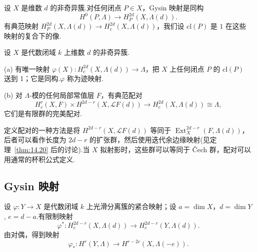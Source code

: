 设 $X$ 是维数 $d$ 的非奇异簇.对任何闭点 $P \in X$，Gysin 映射是同构
\[
H^{0}(P, \Lambda) \to H^{2d}_{P}(X, \Lambda(d)).
\]
有典范映射 $H^{2d}_{P}(X, \Lambda(d)) \to H^{2d}_{c}(X, \Lambda(d))$，我们设 $\mathrm{cl}(P)$ 是 $1$ 在这些映射的复合下的像.

\begin{theorem}\label{thm:24.1}
设 $X$ 是代数闭域 $k$ 上维数 $d$ 的非奇异簇.

(a) 有唯一映射 $\varphi(X) \colon H^{2d}_{c}(X, \Lambda(d)) \to \Lambda$，把 $X$ 上任何闭点 $P$ 的 $\mathrm{cl}(P)$ 送到 1；它是同构.$\varphi$ 称为迹映射.

(b) 对 $\Lambda$-模的任何局部常值层 $F$，有典范配对
\[
H^{r}_{c}(X, F) \times H^{2d-r}(X, \mathcal{L}F(d)) \to H^{2d}_{c}(X, \Lambda(d)) \cong \Lambda,
\]
它们是有限群的完美配对.
\end{theorem}

定义配对的一种方法是将 $H^{2d-r}(X, \mathcal{L}F(d))$ 等同于 $\operatorname{Ext}^{2d-r}_{X}(F, \Lambda(d))$，后者可以看作长度为 $2d - r$ 的扩张群，然后使用迭代余边缘映射(见定理~\ref{thm:14.20} 后的讨论).当 $X$ 拟射影时，这些群可以等同于 \v{C}ech 群，配对可以用通常的杯积公式定义.

\subsection*{Gysin 映射}

设 $\varphi \colon Y \to X$ 是代数闭域 $k$ 上光滑分离簇的紧合映射；设 $a = \dim X$，$d = \dim Y$, $e = d - a$.有限制映射
\[
\varphi^{*} \colon H^{2d-r}_{c}(X, \Lambda(d)) \to H^{2d-r}_{c}(Y, \Lambda(d)).
\]
由对偶，得到映射
\[
\varphi_{*} \colon H^{r}(Y, \Lambda) \to H^{r-2c}(X, \Lambda(-e)).
\]

